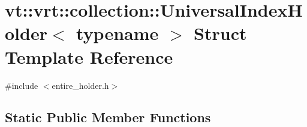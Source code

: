 \hypertarget{structvt_1_1vrt_1_1collection_1_1_universal_index_holder}{}\section{vt\+:\+:vrt\+:\+:collection\+:\+:Universal\+Index\+Holder$<$ typename $>$ Struct Template Reference}
\label{structvt_1_1vrt_1_1collection_1_1_universal_index_holder}


{\ttfamily \#include $<$entire\+\_\+holder.\+h$>$}

\subsection*{Static Public Member Functions}
